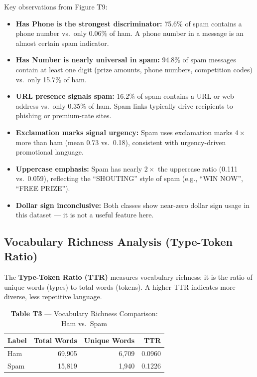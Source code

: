 Key observations from Figure T9:
\begin{itemize}
    \item \textbf{Has Phone is the strongest discriminator:} 75.6\% of spam contains a phone number vs.\ only 0.06\% of ham. A phone number in a message is an almost certain spam indicator.
    \item \textbf{Has Number is nearly universal in spam:} 94.8\% of spam messages contain at least one digit (prize amounts, phone numbers, competition codes) vs.\ only 15.7\% of ham.
    \item \textbf{URL presence signals spam:} 16.2\% of spam contains a URL or web address vs.\ only 0.35\% of ham. Spam links typically drive recipients to phishing or premium-rate sites.
    \item \textbf{Exclamation marks signal urgency:} Spam uses exclamation marks $4\times$ more than ham (mean 0.73 vs.\ 0.18), consistent with urgency-driven promotional language.
    \item \textbf{Uppercase emphasis:} Spam has nearly $2\times$ the uppercase ratio (0.111 vs.\ 0.059), reflecting the ``SHOUTING'' style of spam (e.g., ``WIN NOW'', ``FREE PRIZE'').
    \item \textbf{Dollar sign inconclusive:} Both classes show near-zero dollar sign usage in this dataset --- it is not a useful feature here.
\end{itemize}

\subsection{Vocabulary Richness Analysis (Type-Token Ratio)}

The \textbf{Type-Token Ratio (TTR)} measures vocabulary richness: it is the ratio of unique words (types) to total words (tokens). A higher TTR indicates more diverse, less repetitive language.

\begin{table}[H]
\centering
\caption{\textbf{Table T3} --- Vocabulary Richness Comparison: Ham vs.\ Spam}
\label{tab:text_ttr}
\begin{tabular}{lrrr}
\hline
\textbf{Label} & \textbf{Total Words} & \textbf{Unique Words} & \textbf{TTR} \\
\hline
Ham  & 69{,}905 & 6{,}709 & 0.0960 \\
Spam & 15{,}819 & 1{,}940 & 0.1226 \\
\hline
\end{tabular}
\end{table}

